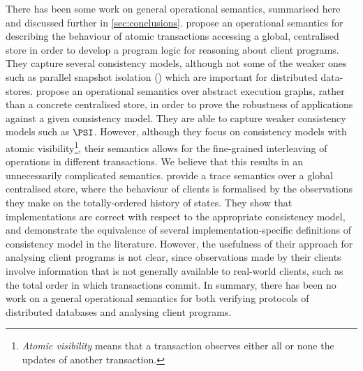 There has been some work on general operational semantics, summarised
here and discussed further in \cref{sec:conclusions}.
\cite{alonetogether} propose an operational
semantics for describing the behaviour of  atomic transactions
accessing a global, centralised store 
in order to develop 
a program logic  for reasoning about client programs. They capture 
 several consistency models, although not some of the  weaker ones
 such as parallel snapshot isolation (\PSI)
 which are important 
for distributed data-stores.
\cite{sureshConcur} propose an operational semantics over abstract
execution graphs, rather than   a concrete centralised store, in order to
prove the robustness of applications against
a given consistency model. They are able to 
capture weaker consistency models
such as \(\PSI\). However, although they focus on consistency models with atomic 
visibility\footnote{\emph{Atomic visibility} means that a  transaction observes either all or none the updates of another transaction.},
their semantics allows for the fine-grained interleaving of operations in different
transactions. We believe that this results  in an unnecessarily complicated semantics.
\cite{seebelieve} provide a trace semantics over a global
centralised store, where the behaviour of clients is formalised by the   
observations they make on the totally-ordered history of states. 
They show  that implementations are correct  with respect to the
appropriate 
consistency model, and demonstrate  the equivalence of several
implementation-specific definitions of
consistency model  in the literature. 
However, the usefulness  of their approach for analysing client programs is not clear, 
since observations made by their clients  involve information that is not generally 
available to real-world clients,  such as the total order in which transactions commit.
In summary, there has been no work on a general operational semantics 
for both verifying protocols of distributed databases and 
analysing  client programs. 

